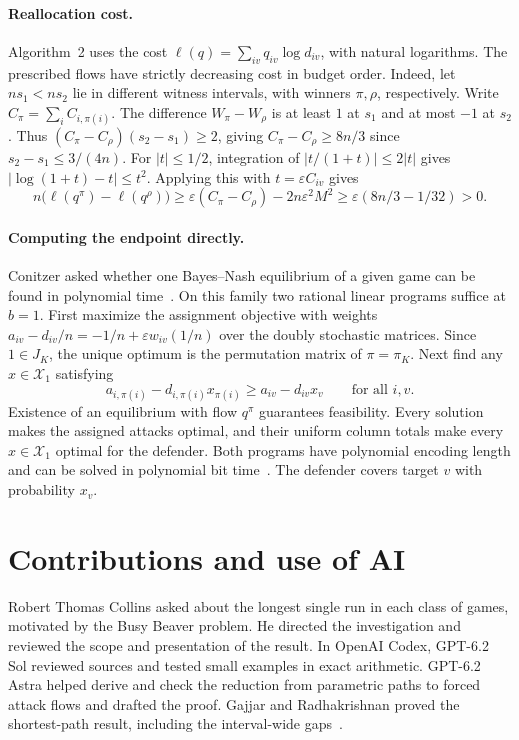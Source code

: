 \documentclass[11pt,letterpaper]{article}
\theoremstyle{definition}
\newcommand{\X}{\mathcal{X}}
\begin{document}
\paragraph{Reallocation cost.}
Algorithm~2 uses the cost \(\ell(q)=\sum_{iv}q_{iv}\log d_{iv}\), with
natural logarithms. The prescribed flows have strictly decreasing cost in
budget order. Indeed, let \(ns_1<ns_2\) lie in different witness intervals,
with winners \(\pi,\rho\), respectively. Write \(C_\pi=\sum_i C_{i,\pi(i)}\).
The difference \(W_\pi-W_\rho\) is at least \(1\) at \(s_1\) and at
most \(-1\) at \(s_2\). Thus \((C_\pi-C_\rho)(s_2-s_1)\ge2\), giving
\(C_\pi-C_\rho\ge8n/3\) since \(s_2-s_1\le3/(4n)\).
For \(|t|\le1/2\), integration of \(|t/(1+t)|\le2|t|\) gives
\(|\log(1+t)-t|\le t^2\). Applying this with \(t=\varepsilon C_{iv}\) gives
\[
  n\bigl(\ell(q^\pi)-\ell(q^\rho)\bigr)
  \ge\varepsilon(C_\pi-C_\rho)-2n\varepsilon^2M^2
  \ge\varepsilon(8n/3-1/32)>0 .
\]

\paragraph{Computing the endpoint directly.}
Conitzer asked whether one Bayes--Nash equilibrium of a given game can be
found in polynomial time~\cite{Conitzer}. On this family two rational linear
programs suffice at \(b=1\). First maximize the assignment objective with weights
\(a_{iv}-d_{iv}/n=-1/n+\varepsilon w_{iv}(1/n)\) over the doubly stochastic
matrices. Since \(1\in J_K\), the unique optimum is the permutation
matrix of \(\pi=\pi_K\). Next find any \(x\in\X_1\) satisfying
\[
  a_{i,\pi(i)}-d_{i,\pi(i)}x_{\pi(i)}
    \ge a_{iv}-d_{iv}x_v\qquad\text{for all }i,v .
\]
Existence of an equilibrium with flow \(q^\pi\) guarantees feasibility.
Every solution makes the assigned attacks optimal, and their uniform
column totals make every \(x\in\X_1\) optimal for the defender. Both
programs have polynomial encoding length and can be solved in polynomial
bit time~\cite{Khachiyan}. The defender covers target \(v\) with probability \(x_v\).

\section*{Contributions and use of AI}

Robert Thomas Collins asked about the longest single run in each class of
games, motivated by the Busy Beaver problem. He directed the investigation
and reviewed the scope and presentation of the result. In OpenAI Codex,
GPT-6.2 Sol reviewed sources and tested small examples in exact arithmetic.
GPT-6.2 Astra helped derive and check the reduction from parametric paths
to forced attack flows and drafted the proof. Gajjar and Radhakrishnan
proved the shortest-path result, including the interval-wide gaps~\cite{GR}.
\end{document}
